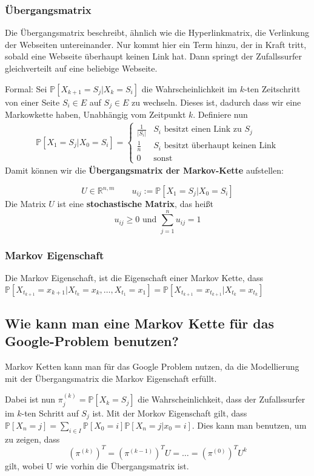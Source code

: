 \documentclass[]{article}
\begin{document}
\subsubsection*{Übergangsmatrix}
Die Übergangsmatrix beschreibt, ähnlich wie die Hyperlinkmatrix, die Verlinkung der Webseiten untereinander. Nur kommt hier ein Term hinzu, der in Kraft tritt, sobald eine Webseite überhaupt keinen Link hat. Dann springt der Zufallssurfer gleichverteilt auf eine beliebige Webseite.
 
Formal:
Sei
$ \mathbb{P}[X_{k+1} = S_j | X_k = S_i ]$  die Wahrscheinlichkeit im $k$-ten Zeitschritt von einer Seite $S_i \in E$ auf $S_j \in E$ zu wechseln. Dieses ist, dadurch dass wir eine Markowkette haben, Unabhängig vom Zeitpunkt $k$. Definiere nun
\begin{align*}
 \mathbb{P} [X_1 = S_j | X_0 = S_i ] =
\begin{cases}
\frac{1}{|S_i|}		& S_i \text{ besitzt einen Link zu } S_j \\
\frac{1}{n}			& S_i \text{ besitzt überhaupt keinen Link} \\
0					& \text{sonst}
\end{cases}
\end{align*}
Damit können wir die \textbf{Übergangsmatrix der Markov-Kette} aufstellen:

\begin{equation*}
U \in \mathbb{R}^{n,m} \qquad u_{ij} := \mathbb{P} [X_1 = S_j | X_0 = S_i ]
\end{equation*}
Die Matrix $U$ ist eine \textbf{stochastische Matrix}, das heißt
\[ u_{ij} \geq 0 \text{ und } \sum_{j=1}^n u_{ij} =1 \]

\subsubsection*{Markov Eigenschaft}
Die Markov Eigenschaft, ist die Eigenschaft einer Markov Kette, dass 
$ \mathbb{P}[X_{t_{k+1}} = x_{k+1} | X_{t_k} = x_{k}, \dots , X_{t_1} = x_{1} ] = \mathbb{P} [X_{t_{k+1}} = x_{t_{k+1}} | X_{t_k} = x_{t_k} ] $

\subsection*{Wie kann man eine Markov Kette für das Google-Problem benutzen? }
Markov Ketten kann man für das Google Problem nutzen, da die Modellierung mit der Übergangsmatrix die Markov Eigenschaft erfüllt. 

Dabei ist nun $\pi_j^{(k)} = \mathbb{P} [X_k = S_j] $
die Wahrscheinlichkeit, dass der Zufallssurfer im $k$-ten Schritt auf $S_j$ ist. 
Mit der Morkov Eigenschaft gilt, dass $\mathbb{P}[X_n=j]= \sum\limits_{i \in I} \mathbb{P}[X_0 = i] \mathbb{P}[X_n=j|x_0=i]$.
Dies kann man benutzen, um zu zeigen, dass  
\begin{equation*}
\left( \pi^{(k)} \right)^T
= \left( \pi^{(k-1)} \right)^T U
= \dotsc 
= \left( \pi^{(0)} \right)^T U^k
\end{equation*}
gilt, wobei U wie vorhin die Übergangsmatrix ist. 
\end{document}
